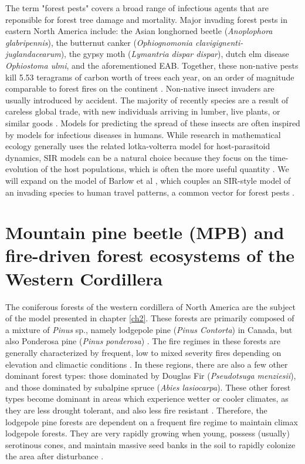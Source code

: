 The term "forest pests" covers a broad range of infectious agents that are reponsible for forest tree damage and mortality. Major invading forest pests in eastern North America include: the Asian longhorned beetle (\textit{Anoplophora glabripennis}), the butternut canker (\textit{Ophiognomonia clavigignenti-juglandacearum}), the gypsy moth (\textit{Lymantria dispar dispar}), dutch elm disease \textit{Ophiostoma ulmi}, and the aforementioned EAB. Together, these non-native pests kill 5.53 teragrams of carbon worth of trees each year, on an order of magnitude comparable to forest fires on the continent \cite{fei2019biomass}. Non-native insect invaders are usually introduced by accident. The majority of recently species are a result of careless global trade, with new individuals arriving in lumber, live plants, or similar goods \cite{brockerhoff2017ecology}. Models for predicting the spread of these insects are often inspired by models for infectious diseases in humans. While research in mathematical ecology generally uses the related lotka-volterra model for host-parasitoid dynamics, SIR models can be a natural choice because they focus on the time-evolution of the host populations, which is often the more useful quantity \cite{edelstein2005mathematical}. We will expand on the model of Barlow et al \cite{barlow2014modelling}, which couples an SIR-style model of an invading species to human travel patterns, a common vector for forest pests \cite{buck2009hitchhiking,kolar2001progress,wilson2009something}.

\section{Mountain pine beetle (MPB) and fire-driven forest ecosystems of the Western Cordillera}

The coniferous forests of the western cordillera of North America are the subject of the model presented in chapter \ref{ch2}. These forests are primarily composed of a mixture of \textit {Pinus} sp., namely lodgepole pine (\textit{Pinus Contorta}) in Canada, but also Ponderosa pine (\textit{Pinus ponderosa}) \cite{brown2010impact}. The fire regimes in these forests are generally characterized by frequent, low to mixed severity fires depending on elevation and climactic conditions \cite{agee1996fire,arno1980forest}. In these regions, there are also a few other dominant forest types: those dominated by Douglas Fir (\textit{Pseudotsuga menziesii}), and those dominated by subalpine spruce (\textit{Abies lasiocarpa}). These other forest types become dominant in areas which experience wetter or cooler climates, as they are less drought tolerant, and also less fire resistant \cite{JENKINS200816}. Therefore, the lodgepole pine forests are dependent on a frequent fire regime to maintain climax lodgepole forests. They are very rapidly growing when young, possess (usually) serotinous cones, and maintain massive seed banks in the soil to rapidly colonize the area after disturbance \cite{lotan1976cone,lotan1985role}.

